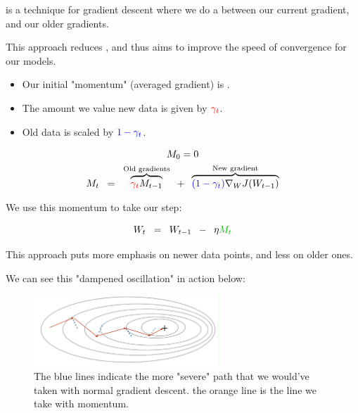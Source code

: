             \begin{definition}
                 is a technique for gradient descent where we do a  between our current gradient, and our older gradients.

                This approach reduces , and thus aims to improve the speed of convergence for our models.

                \begin{itemize}
                    \item Our initial "momentum" (averaged gradient) is .
                    \item The amount we value new data is given by $\textcolor{red}{\gamma_t}$.
                    \item Old data is scaled by $\textcolor{blue}{1-\gamma_t}$.
                \end{itemize}

                \begin{equation*}
                    \begin{gathered}
                        M_0=0 \\
                        M_t 
                        \;\;=\;\;
                        \overbrace{
                            \textcolor{red}{\gamma_t} M_{t-1}
                        }^{\text{Old gradients}}
                        \;\;+\;\; 
                        \overbrace{
                            \textcolor{blue}{(1-\gamma_t)} \nabla_W J (W_{t-1})
                        }^{\text{New gradient}}
                    \end{gathered}
                \end{equation*}

                We use this momentum to take our step:

                \begin{equation*}
                    W_t \;\;=\;\; W_{t-1} \;\;-\;\; \eta \grn{M_t}
                \end{equation*}
                
                \phantom{}

                This approach puts more emphasis on newer data points, and less on older ones.
            \end{definition}

            \miniex We can see this "dampened oscillation" in action below:

            \begin{figure}[H]
                \centering
                    \includegraphics[width=70mm,scale=0.5]{images/nn_2_images/momentum.png}
                
                \caption*{The blue lines indicate the more "severe" path that we would've taken with normal gradient descent. the orange line is the line we take with momentum. }
            \end{figure}

